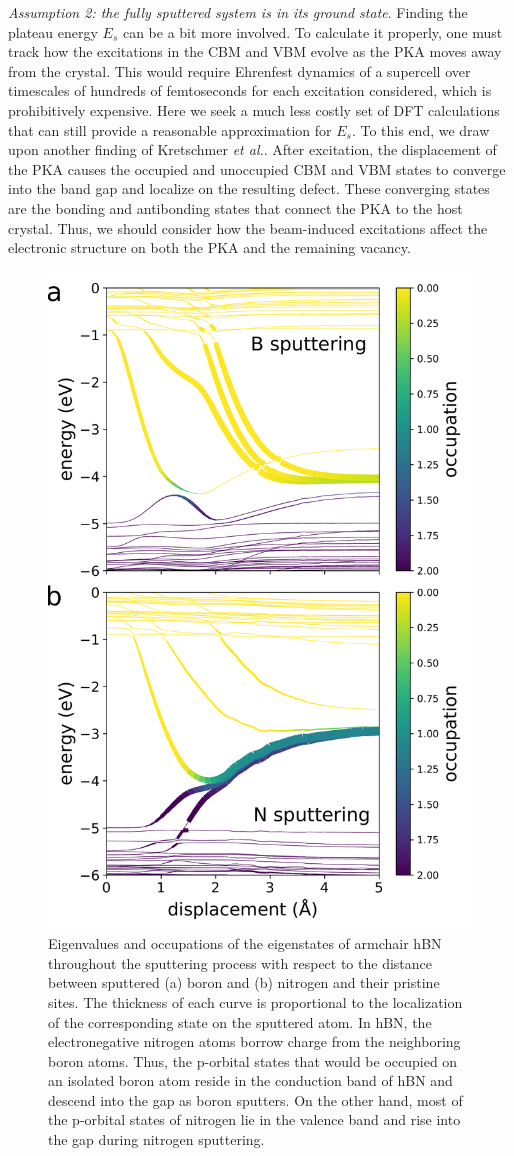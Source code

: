 \documentclass[twoside,twocolumn,9pt]{article}
\begin{document}
\medskip\noindent
\textit{Assumption 2: the fully sputtered system is in its ground state}.
Finding the plateau energy $E_s$ can be a bit more involved. To calculate it
properly, one must track how the excitations in the CBM and VBM evolve as the
PKA moves away from the crystal.
This would require Ehrenfest dynamics of a supercell over timescales of
hundreds of femtoseconds for each excitation considered, which is
prohibitively expensive.
Here we seek a much less costly set of DFT calculations that can still provide
a reasonable approximation for $E_s$.
To this end, we draw upon another finding of Kretschmer \textit{et al.}.
\cite{Kretschmer2020}
After excitation, the displacement of the PKA causes the occupied and
unoccupied CBM and VBM states to converge into the band gap and localize on the
resulting defect.
These converging states are the bonding and antibonding states that connect the
PKA to the host crystal.
Thus, we should consider how the beam-induced excitations affect the electronic
structure on both the PKA and the remaining vacancy.

\begin{figure}
  \centering
  \includegraphics[width=.45\textwidth]{figures/eigenvals_portrait.pdf}
  \caption{
    Eigenvalues and occupations of the eigenstates of armchair hBN throughout
    the sputtering process with respect to the distance between sputtered (a)
    boron and (b) nitrogen and their pristine sites.
    The thickness of each curve is proportional to the localization of the
    corresponding state on the sputtered atom.
    In hBN, the electronegative nitrogen atoms borrow charge from the
    neighboring boron atoms.
    Thus, the p-orbital states that would be occupied on an isolated boron atom
    reside in the conduction band of hBN and descend into the gap as boron
    sputters.
    On the other hand, most of the p-orbital states of nitrogen lie in the
    valence band and rise into the gap during nitrogen sputtering.
  }
  \label{fig:eigenvals}
\end{figure}
\end{document}
